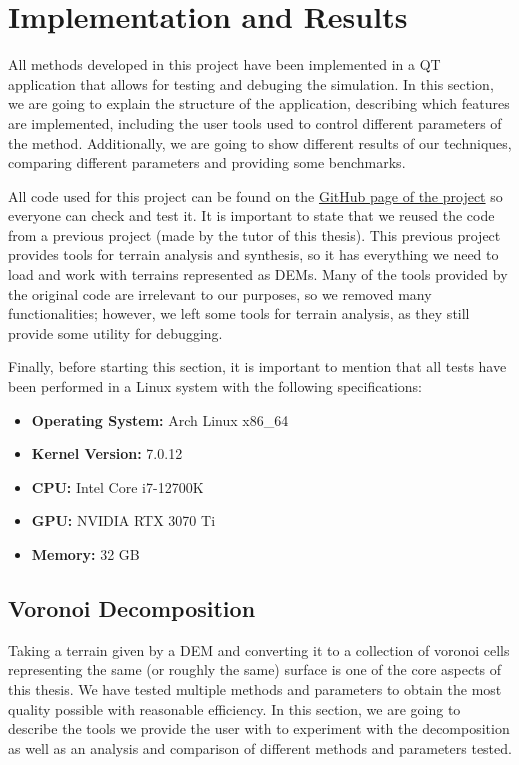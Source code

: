 \chapter{Implementation and Results} \label{sec:implementationResults}
All methods developed in this project have been implemented in a 
QT application that allows for testing and debuging the simulation. In 
this section, we are going to explain the structure of the application, 
describing which features are implemented, including the user tools used to control 
different parameters of the method. Additionally, we are going to 
show different results of our techniques, comparing  
different parameters and providing some benchmarks.

\vspace{10pt}

All code used for this project can be found on the 
\href{https://github.com/Lluna-CC/Modeling-Erosion}{GitHub page of the project} 
so everyone can check and test it. It is important to state that we reused the code from a previous 
project \cite{Argudo2025descriptors} (made by the tutor of this thesis). This 
previous project provides tools for terrain analysis and synthesis, so it 
has everything we need to load and work with terrains represented as 
DEMs. Many of the tools provided by the original code are irrelevant to our 
purposes, so we removed many functionalities; however, we left some tools 
for terrain analysis, as they still provide some utility for debugging. 


\vspace{10pt}

Finally, before starting this section, it is important to 
mention that all tests have been performed in a Linux system with the following specifications:

\begin{itemize}
    \item \textbf{Operating System:} Arch Linux x86\_64
    \item \textbf{Kernel Version:} 7.0.12
    \item \textbf{CPU:} Intel Core i7-12700K
    \item \textbf{GPU:} NVIDIA RTX 3070 Ti
    \item \textbf{Memory:} 32 GB
\end{itemize}


\section{Voronoi Decomposition}
Taking a terrain given by a DEM and converting it to a collection of voronoi
cells representing the same (or roughly the same) surface is one of the 
core aspects of this thesis. We have tested multiple methods and parameters 
to obtain the most quality possible with reasonable 
efficiency. In this section, we are going to describe the tools we provide 
the user with to experiment with the decomposition as well as an analysis 
and comparison of different methods and parameters tested. 
